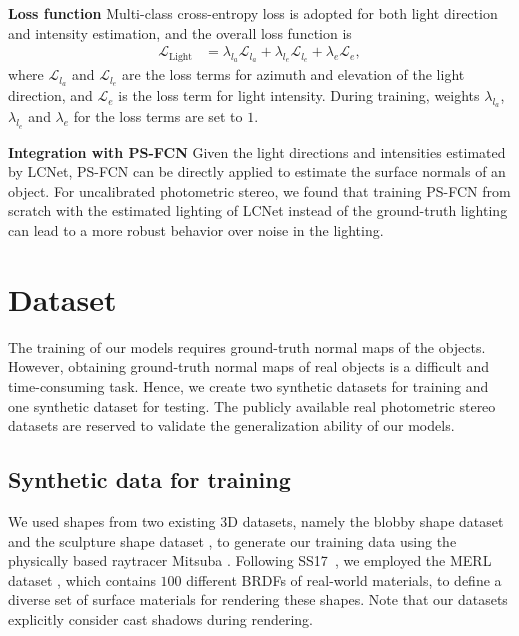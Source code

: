 \documentclass[10pt,journal,compsoc]{IEEEtran}
\renewcommand{\paragraph}[1]{\vspace{0.2em}\noindent \textbf{#1 \hspace{0.2em}}}
\begin{document}
\paragraph{Loss function}
Multi-class cross-entropy loss is adopted for both light direction and intensity estimation, and the overall loss function is
\begin{align}
    \label{eq:cls_loss}
    \mathcal{L}_{\text{Light}} & = \lambda_{l_a} \mathcal{L}_{l_a} + \lambda_{l_e} \mathcal{L}_{l_e} + \lambda_e \mathcal{L}_e,
\end{align}
where $\mathcal{L}_{l_a}$ and $\mathcal{L}_{l_e}$ are the loss terms for azimuth and elevation of the light direction, and  $\mathcal{L}_e$ is the loss term for light intensity. During training, weights $\lambda_{l_a}$, $\lambda_{l_e}$ and $\lambda_e$ for the loss terms are set to $1$.

\paragraph{Integration with PS-FCN} 
Given the light directions and intensities estimated by LCNet, PS-FCN can be directly applied to estimate the surface normals of an object. 
For uncalibrated photometric stereo, we found that training PS-FCN from scratch with the estimated lighting of LCNet instead of the ground-truth lighting can lead to a more robust behavior over noise in the lighting. 


\section{Dataset}
The training of our models requires ground-truth normal maps of the objects. However, obtaining ground-truth normal maps of real objects is a difficult and time-consuming task. Hence, we create two synthetic datasets for training and one synthetic dataset for testing. The publicly available real photometric stereo datasets are reserved to validate the generalization ability of our models. 

\subsection{Synthetic data for training}
We used shapes from two existing 3D datasets, namely the blobby shape dataset \cite{johnson2011shape} and the sculpture shape dataset \cite{wiles2017silnet}, to generate our training data using the physically based raytracer Mitsuba \cite{jakob2010mitsuba}. Following SS17~\cite{santo2017deep}, we employed the MERL dataset \cite{matusik2003merl}, which contains $100$ different BRDFs of real-world materials, to define a diverse set of surface materials for rendering these shapes. 
Note that our datasets explicitly consider cast shadows during rendering.
\end{document}
